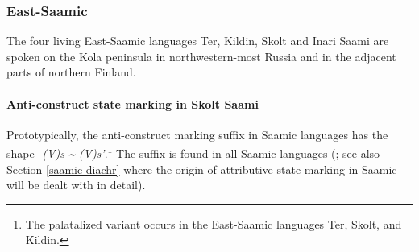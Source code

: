 \subsubsection{East-Saamic}
The four living East-Saamic languages Ter, Kildin, Skolt and Inari Saami are spoken on the Kola peninsula in northwestern-most Russia and in the adjacent parts of northern Finland.

\paragraph{Anti-construct state marking in Skolt Saami}
Prototypically, the anti-con\-struct marking suffix in Saamic languages has the shape \textit{-(V)s \textasciitilde-(V)s'}.\footnote{The palatalized variant occurs in the East-Saamic languages Ter, Skolt, and Kildin.} The suffix is found in all Saamic languages (\citealt{riesler2006b}; see also Section \ref{saamic diachr} where the origin of attributive state marking in Saamic will be dealt with in detail). 

